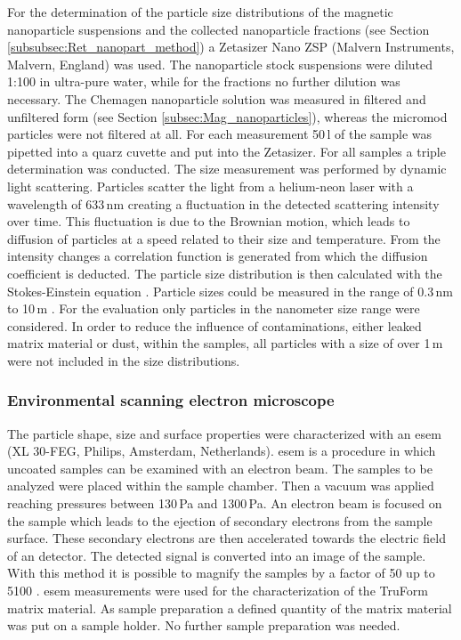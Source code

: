 For the determination of the particle size distributions of the magnetic nanoparticle suspensions and the collected nanoparticle fractions (see Section \ref{subsubsec:Ret_nanopart_method}) a Zetasizer Nano ZSP (Malvern Instruments, Malvern, England) was used. The nanoparticle stock suspensions were diluted 1:100 in ultra-pure water, while for the fractions no further dilution was necessary. The Chemagen nanoparticle solution was measured in filtered and unfiltered form (see Section \ref{subsec:Mag_nanoparticles}), whereas the micromod particles were not filtered at all. For each measurement 50\,\textmu l of the sample was pipetted into a quarz cuvette and put into the Zetasizer. For all samples a triple determination was conducted. The size measurement was performed by dynamic light scattering. Particles scatter the light from a helium-neon laser with a wavelength of 633\,nm creating a fluctuation in the detected scattering intensity over time. This fluctuation is due to the Brownian motion, which leads to diffusion of particles at a speed related to their size and temperature. From the intensity changes a correlation function is generated from which the diffusion coefficient is deducted. The particle size distribution is then calculated with the Stokes-Einstein equation \cite{berne2000dynamic}. Particle sizes could be measured in the range of 0.3\,nm to 10\,\textmu m \cite{Zetasizer}. For the evaluation only particles in the nanometer size range were considered. In order to reduce the influence of contaminations, either leaked matrix material or dust, within the samples, all particles with a size of over 1\,\textmu m were not included in the size distributions.

\subsubsection{Environmental scanning electron microscope}
\label{subsubsec:ESEM}
The particle shape, size and surface properties were characterized with an \gls{esem} (XL 30-FEG, Philips, Amsterdam, Netherlands). \gls{esem} is a procedure in which uncoated samples can be examined with an electron beam. The samples to be analyzed were placed within the sample chamber. Then a vacuum was applied reaching pressures between 130\,Pa and 1300\,Pa. An electron beam is focused on the sample which leads to the ejection of secondary electrons from the sample surface. These secondary electrons are then accelerated towards the electric field of an detector. The detected signal is converted into an image of the sample. With this method it is possible to magnify the samples by a factor of 50 up to 5100 \cite{danilatos1993introduction}.     
\gls{esem} measurements were used for the characterization of the TruForm matrix material. As sample preparation a defined quantity of the matrix material was put on a sample holder. No further sample preparation was needed.

